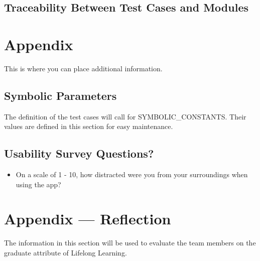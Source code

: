 \documentclass[12pt, titlepage]{article}
\begin{document}
\subsection{Traceability Between Test Cases and Modules}

				




\newpage

\section{Appendix}

This is where you can place additional information.

\subsection{Symbolic Parameters}

The definition of the test cases will call for SYMBOLIC\_CONSTANTS.
Their values are defined in this section for easy maintenance.

\subsection{Usability Survey Questions?}

\begin{itemize}
    \item On a scale of 1 - 10, how distracted were you from your surroundings when using the app?
\end{itemize}

\newpage{}
\section*{Appendix --- Reflection}


The information in this section will be used to evaluate the team members on the
graduate attribute of Lifelong Learning.


\end{document}
